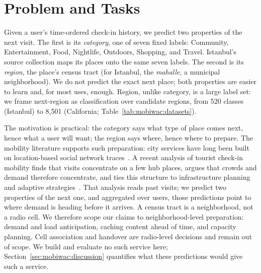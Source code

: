 \section{Problem and Tasks}
\label{sec:mobiwac:problem}

Given a user's time-ordered check-in history, we predict two properties of the next visit. The first is its \emph{category}, one of seven fixed labels: Community, Entertainment, Food,
Nightlife, Outdoors, Shopping, and Travel. Istanbul's source collection maps its places onto the same seven labels. The second is its \emph{region}, the place's census tract (for Istanbul, the \emph{mahalle}, a municipal neighborhood). We do not predict the exact next place; both properties are easier to learn and, for most uses, enough. Region, unlike category, is a large label set: we frame next-region as classification over candidate regions, from 520 classes (Istanbul) to 8,501 (California; Table~\ref{tab:mobiwac:datasets}).

The motivation is practical: the category says what type of place comes next, hence what a user will want; the region says where, hence where to prepare. The mobility literature supports such preparation: city services have long been built on location-based social network traces~\cite{silva2019urbancomputing}. A recent analysis of tourist check-in
mobility finds that visits concentrate on a few hub places, argues that crowds and demand therefore concentrate, and ties this structure to
infrastructure planning and adaptive strategies~\cite{moura2025mobilityaware}.
That analysis reads past visits; we predict two properties of
the next one, and aggregated over users, those predictions point to where
demand is heading before it arrives. A census
tract is a neighborhood, not a radio cell. We therefore scope our claims to
neighborhood-level preparation: demand and load anticipation, caching content
ahead of time, and capacity planning. Cell association and handover are
radio-level decisions and remain out of scope. We build and evaluate no such
service here; Section~\ref{sec:mobiwac:discussion} quantifies what these predictions
would give such a service.

